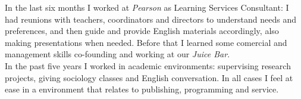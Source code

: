 \documentclass[a4paper,hidelinks]{twentysecondcv} %
\begin{document}
In the last six months I worked at \textit{Pearson} as Learning Services Consultant: I had reunions with teachers, coordinators and directors to understand needs and preferences, and then guide and provide English materials accordingly, also making presentations when needed. 
Before that I learned some comercial and management skills co-founding and working at our \textit{Juice Bar}.
\\
In the past five years I worked in academic environments: supervising research projects, giving sociology classes and English conversation. In all cases I feel at ease in a environment that relates to publishing, programming and service.

\end{document}
